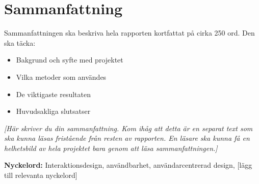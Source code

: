 \section*{Sammanfattning}

Sammanfattningen ska beskriva hela rapporten kortfattat på cirka 250 ord. Den ska täcka:
\begin{itemize}
    \item Bakgrund och syfte med projektet
    \item Vilka metoder som användes
    \item De viktigaste resultaten
    \item Huvudsakliga slutsatser
\end{itemize}

\textit{[Här skriver du din sammanfattning. Kom ihåg att detta är en separat text som ska kunna läsas fristående från resten av rapporten. En läsare ska kunna få en helhetsbild av hela projektet bara genom att läsa sammanfattningen.]}

\vspace{1cm}

\noindent\textbf{Nyckelord:} Interaktionsdesign, användbarhet, användarcentrerad design, [lägg till relevanta nyckelord]
